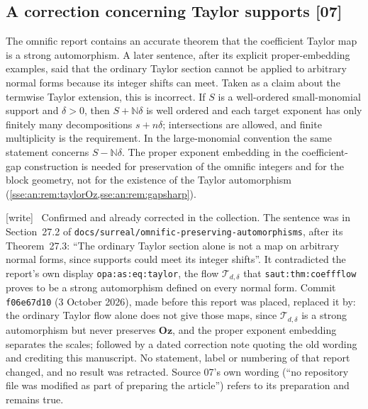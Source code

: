 \documentclass[11pt,a4paper]{article}
\numberwithin{equation}{section}
\theoremstyle{plain}
\theoremstyle{definition}
\theoremstyle{remark}
\newcommand{\Oz}{\mathbf{Oz}}
\newcommand{\N}{\mathbb{N}}
\newcommand{\code}[1]{\texttt{\small #1}}
\newcommand{\lbl}[1]{\nolinkurl{#1}}%
\newcommand{\fn}[1]{\nolinkurl{#1}}%
\newcommand{\src}[1]{\textup{\textsf{\small[#1]}}}%
\newcommand{\wtag}{\textup{\textsf{[write]}}}%
\newenvironment{wnote}{\par\smallskip\noindent\wtag\ }{\par\smallskip}
\begin{document}
\subsection{A correction concerning Taylor supports \src{07}}\label{sse:an:sub:taylorcorrection}
The omnific report contains an accurate theorem that the coefficient Taylor map
is a strong automorphism. A later sentence, after its explicit
proper-embedding examples, said that the ordinary Taylor section cannot be
applied to arbitrary normal forms because its integer shifts can meet. Taken
as a claim about the termwise Taylor extension, this is incorrect. If $S$ is a
well-ordered small-monomial support and $\delta>0$, then $S+\N\delta$ is well
ordered and each target exponent has only finitely many decompositions
$s+n\delta$; intersections are allowed, and finite multiplicity is the
requirement. In the large-monomial convention the same statement concerns
$S-\N\delta$. The proper exponent embedding in the coefficient-gap
construction is needed for preservation of the omnific integers and for the
block geometry, not for the existence of the Taylor automorphism
(\cref{sse:an:rem:taylorOz,sse:an:rem:gapsharp}).
\begin{wnote}
Confirmed and already corrected in the collection. The sentence was in
Section~27.2 of \fn{docs/surreal/omnific-preserving-automorphisms}, after its
Theorem~27.3: ``The ordinary Taylor section alone is not a map on arbitrary
normal forms, since supports could meet its integer shifts''. It contradicted
the report's own display \lbl{opa:as:eq:taylor}, the flow $\mathcal T_{d,\delta}$
that \lbl{saut:thm:coeffflow} proves to be a strong automorphism defined on
every normal form. Commit \code{f06e67d10} (3 October 2026), made before this
report was placed, replaced it by: the ordinary Taylor flow alone does not give
those maps, since $\mathcal T_{d,\delta}$ is a strong automorphism but never
preserves $\Oz$, and the proper exponent embedding separates the scales;
followed by a dated correction note quoting the old wording and crediting this
manuscript. No statement, label or numbering of that report changed, and no
result was retracted. Source 07's own wording (``no repository file was
modified as part of preparing the article'') refers to its preparation and
remains true.
\end{wnote}
\end{document}
